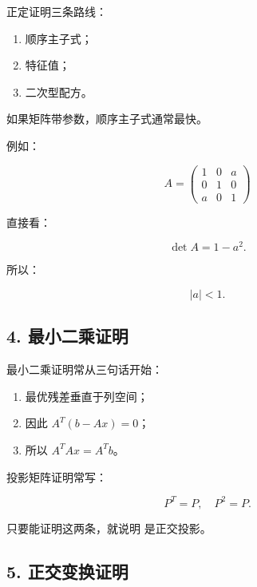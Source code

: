 \documentclass[11pt,a4paper]{ctexart}
\newcommand{\code}[1]{\begingroup\ttfamily\small #1\endgroup}
\begin{document}

正定证明三条路线：

\begin{enumerate}

\item 顺序主子式；

\item 特征值；

\item 二次型配方。

\end{enumerate}

如果矩阵带参数，顺序主子式通常最快。

例如：

\[
A=\begin{pmatrix}1&0&a\\0&1&0\\a&0&1\end{pmatrix}
\]

直接看：

\[
\det A=1-a^2.
\]

所以：

\[
|a|<1.
\]


\subsection*{4. 最小二乘证明}


最小二乘证明常从三句话开始：

\begin{enumerate}

\item 最优残差垂直于列空间；

\item 因此 $A^T(b-Ax)=0$；

\item 所以 $A^TAx=A^Tb$。

\end{enumerate}

投影矩阵证明常写：

\[
P^T=P,\quad P^2=P.
\]

只要能证明这两条，就说明 \code{} 是正交投影。


\subsection*{5. 正交变换证明}
\end{document}
